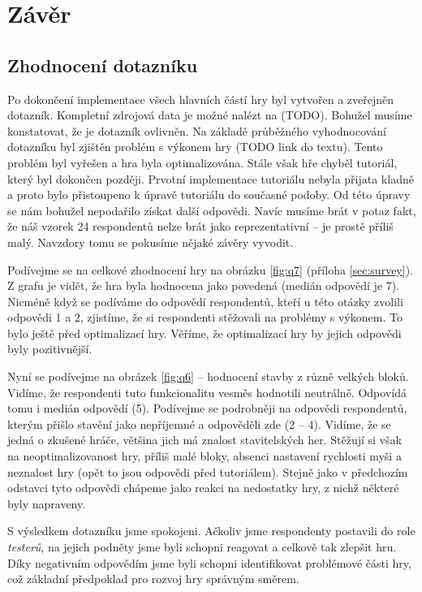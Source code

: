 
\chapter{Závěr}

\section{Zhodnocení dotazníku}
\label{sec:quest}

Po dokončení implementace všech hlavních částí hry byl vytvořen a zveřejněn dotazník. Kompletní zdrojová data je možné nalézt na (TODO). Bohužel musíme konstatovat, že je dotazník ovlivněn. Na základě průběžného vyhodnocování dotazníku byl zjištěn problém s výkonem hry (TODO link do textu). Tento problém byl vyřešen a hra byla optimalizována. Stále však hře chyběl tutoriál, který byl dokončen později. Prvotní implementace tutoriálu nebyla přijata kladně a proto bylo přistoupeno k úpravě tutoriálu do současné podoby. Od této úpravy se nám bohužel nepodařilo získat další odpovědi. Navíc musíme brát v potaz fakt, že náš vzorek 24 respondentů nelze brát jako reprezentativní -- je prostě příliš malý. Navzdory tomu se pokusíme nějaké závěry vyvodit.

Podívejme se na celkové zhodnocení hry na obrázku \ref{fig:q7} (příloha \ref{sec:survey}). Z grafu je vidět, že hra byla hodnocena jako povedená (medián odpovědí je 7). Nicméně když se podíváme do odpovědí respondentů, kteří u této otázky zvolili odpovědi 1 a 2, zjistíme, že si respondenti stěžovali na problémy s výkonem. To bylo ještě před optimalizací hry. Věříme, že optimalizací hry by jejich odpovědi byly pozitivnější. 

Nyní se podívejme na obrázek \ref{fig:q6} -- hodnocení stavby z různě velkých bloků. Vidíme, že respondenti tuto funkcionalitu vesměs hodnotili neutrálně. Odpovídá tomu i medián odpovědí (5). Podívejme se podrobněji na odpovědi respondentů, kterým přišlo stavění jako nepříjemné a odpověděli zde (2 -- 4). Vidíme, že se jedná o zkušené hráče, většina jich má znalost stavitelských her. Stěžují si však na neoptimalizovanost hry, příliš malé bloky, absenci nastavení rychlosti myši a neznalost hry (opět to jsou odpovědi před tutoriálem). Stejně jako v předchozím odstavci tyto odpovědi chápeme jako reakci na nedostatky hry, z nichž některé byly napraveny.

S výsledkem dotazníku jsme spokojeni. Ačkoliv jsme respondenty postavili do role \textit{testerů}, na jejich podněty jsme byli schopni reagovat a celkově tak zlepšit hru. Díky negativním odpovědím jsme byli schopni identifikovat problémové části hry, což základní předpoklad pro rozvoj hry správným směrem.

